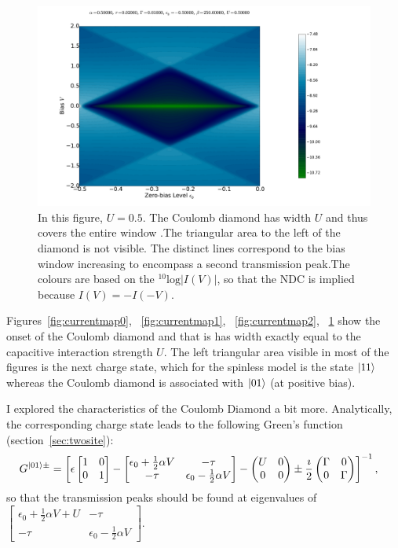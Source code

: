 \begin{figure}[h]
    \centering
    \includegraphics[height=.38\textheight]{pdf/coulombd/current_map_u3.pdf}
    \caption{In this figure, $U=0.5$. The Coulomb diamond has width $U$ and thus covers the entire window .The triangular area to the left of the diamond is not visible. The distinct lines correspond to the bias window increasing to encompass a second transmission peak.The colours are based on the $^{10}\text{log}\left|I(V)\right|$, so that the NDC is implied because $I(V) = -I(-V)$.}
    \label{fig:currentmap3}
\end{figure}

Figures~\ref{fig:currentmap0}, ~\ref{fig:currentmap1}, ~\ref{fig:currentmap2}, ~\ref{fig:currentmap3} show the onset of the Coulomb diamond and that is has width exactly equal to the capacitive interaction strength $U$. The left triangular area visible in most of the figures is the next charge state, which for the spinless model is the state $\ket{11}$ whereas the Coulomb diamond is associated with $\ket{01}$ (at positive bias). 

I explored the characteristics of the Coulomb Diamond a bit more. Analytically, the corresponding charge state leads to the following Green's function (section~\ref{sec:twosite}):
\begin{align*}
G^{\ket{01}\pm} &= \left[ \epsilon \begin{bmatrix} 1 & 0 \\ 0 & 1 \end{bmatrix} - \begin{bmatrix} \epsilon_0 + \frac{1}{2} \alpha V & -\tau \\
-\tau & \epsilon_0 - \frac{1}{2} \alpha V\end{bmatrix} - \begin{pmatrix} U & 0 \\ 0 & 0 \end{pmatrix} \pm \frac{\imath}{2} \begin{pmatrix} \Gamma & 0 \\ 0 & \Gamma \end{pmatrix} \right]^{-1},
\end{align*}
so that the transmission peaks should be found at eigenvalues of $\begin{bmatrix} \epsilon_0 + \frac{1}{2} \alpha V+U & -\tau \\
-\tau & \epsilon_0 - \frac{1}{2} \alpha V\end{bmatrix}$.

